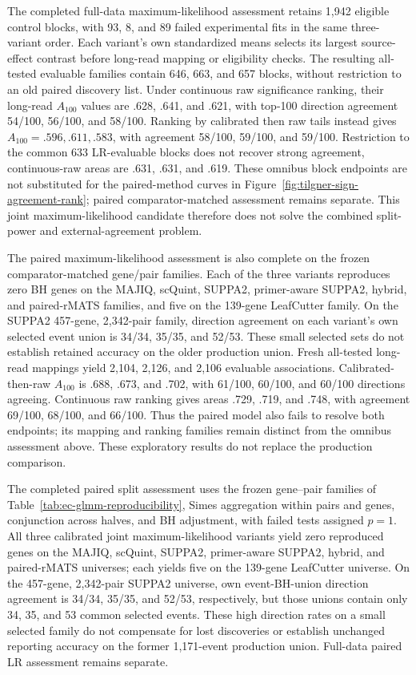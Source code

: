 \documentclass[11pt]{article}
\begin{document}
The completed full-data maximum-likelihood assessment retains 1,942 eligible control blocks, with 93, 8, and 89 failed experimental fits in the same three-variant order. Each variant's own standardized means selects its largest source-effect contrast before long-read mapping or eligibility checks. The resulting all-tested evaluable families contain 646, 663, and 657 blocks, without restriction to an old paired discovery list. Under continuous raw significance ranking, their long-read \(A_{100}\) values are .628, .641, and .621, with top-100 direction agreement 54/100, 56/100, and 58/100. Ranking by calibrated then raw tails instead gives \(A_{100}=.596,.611,.583\), with agreement 58/100, 59/100, and 59/100. Restriction to the common 633 LR-evaluable blocks does not recover strong agreement, continuous-raw areas are .631, .631, and .619. These omnibus block endpoints are not substituted for the paired-method curves in Figure~\ref{fig:tilgner-sign-agreement-rank}; paired comparator-matched assessment remains separate. This joint maximum-likelihood candidate therefore does not solve the combined split-power and external-agreement problem.

The paired maximum-likelihood assessment is also complete on the frozen comparator-matched gene/pair families. Each of the three variants reproduces zero BH genes on the MAJIQ, scQuint, SUPPA2, primer-aware SUPPA2, hybrid, and paired-rMATS families, and five on the 139-gene LeafCutter family. On the SUPPA2 457-gene, 2,342-pair family, direction agreement on each variant's own selected event union is 34/34, 35/35, and 52/53. These small selected sets do not establish retained accuracy on the older production union. Fresh all-tested long-read mappings yield 2,104, 2,126, and 2,106 evaluable associations. Calibrated-then-raw \(A_{100}\) is .688, .673, and .702, with 61/100, 60/100, and 60/100 directions agreeing. Continuous raw ranking gives areas .729, .719, and .748, with agreement 69/100, 68/100, and 66/100. Thus the paired model also fails to resolve both endpoints; its mapping and ranking families remain distinct from the omnibus assessment above. These exploratory results do not replace the production comparison.

The completed paired split assessment uses the frozen gene--pair families of Table~\ref{tab:ec-glmm-reproducibility}, Simes aggregation within pairs and genes, conjunction across halves, and BH adjustment, with failed tests assigned \(p=1\). All three calibrated joint maximum-likelihood variants yield zero reproduced genes on the MAJIQ, scQuint, SUPPA2, primer-aware SUPPA2, hybrid, and paired-rMATS universes; each yields five on the 139-gene LeafCutter universe. On the 457-gene, 2,342-pair SUPPA2 universe, own event-BH-union direction agreement is 34/34, 35/35, and 52/53, respectively, but those unions contain only 34, 35, and 53 common selected events. These high direction rates on a small selected family do not compensate for lost discoveries or establish unchanged reporting accuracy on the former 1,171-event production union. Full-data paired LR assessment remains separate.
\end{document}
